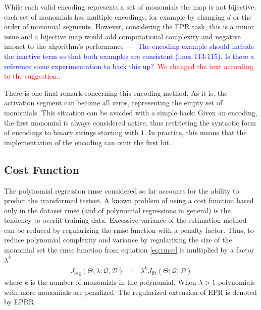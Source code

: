 \documentclass[review,preprint]{elsarticle}
\newcommand{\review}[1]{\textcolor{blue}{~---~#1}}
\newcommand{\revised}[2]{\review{#1}~\textcolor{red}{#2}}
\begin{document}
While each valid encoding represents a set of monomials the map is not bijective: each set of monomials has multiple encodings, for example by changing $d$ or the order of monomial segments. However, considering the \ac{EPR} task, this is a minor issue and a bijective map would add computational complexity and negative impact to the algorithm's performance\revised{The encoding example should include the inactive term so that both examples are consistent (lines 113-115). Is there a reference some experimentation to back this up?}{We changed the text according to the suggestion.}.

There is one final remark concerning this encoding method. As it is, the activation segment can become all zeros, representing the empty set of monomials. This situation can be avoided with a simple hack: Given an encoding, the first monomial is always considered active, thus restricting the syntactic form of encodings to binary strings starting with $1$. In practice, this means that the implementation of the encoding can omit the first bit.

\subsection{Cost Function}\label{subs:cost.function}

The polynomial regression \ac{rmse} considered so far accounts for the ability to predict the transformed testset. A known problem of using a cost function based only in the dataset \ac{rmse} (and of polynomial regressions in general) is the tendency to overfit  training data. Excessive variance of the estimation method can be reduced by regularizing the \ac{rmse} function with a penalty factor. Thus, to reduce polynomial complexity and variance by regularizing the size of the monomial set the \ac{rmse} function from equation \ref{eq:rmse} is multiplied by a factor $\lambda^{k}$
\begin{eqnarray}
J_{\textrm{reg}}\left(\Theta, \lambda;\mathcal{Q},\mathcal{D}\right) &=& \lambda^{k} J_{\textrm{fit}}\left(\Theta;\mathcal{Q},\mathcal{D}\right)\label{eq:rmse-reg}
\end{eqnarray}
%
where $k$ is the number of monomials in the polynomial. When $\lambda > 1$ polynomials with more monomials are penalized. The regularized extension of \ac{EPR} is denoted by \acf{EPRR}. 
\end{document}
